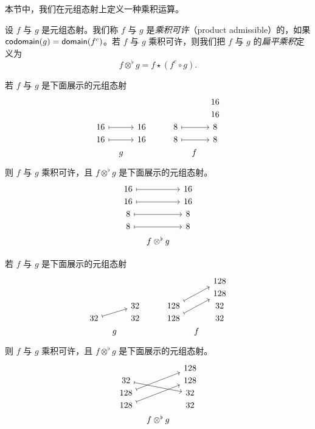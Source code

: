 本节中，我们在元组态射上定义一种乘积运算。 
\begin{definition}
设 $f$ 与 $g$ 是元组态射。我们称 $f$ 与 $g$ 是{\it 乘积可许}（product admissible）的，如果 $\mathsf{codomain}(g) = \mathsf{domain}(f^c)$。若 $f$ 与 $g$ 乘积可许，则我们把 $f$ 与 $g$ 的{\it 扁平乘积}定义为  
    \[
    f \otimes^\flat g = f \star (f^c \circ g).
    \]
\end{definition}



\begin{example}
    若 $f$ 与 $g$ 是下面展示的元组态射
    \[ \begin{tikzcd} [row sep = 1, column sep = 8]
      & & & & & & & 16\\
      & & & & & & & 16\\
     16 \ar[rr,mapsto] & & 16 & & & 8 \ar[rr,mapsto] & & 8\\
    16 \ar[rr,mapsto] & & 16 & & & 8 \ar[rr,mapsto] & & 8\\
    & g & & & & & f & \\
    \end{tikzcd} \]
    则
    $f$ 与 $g$ 乘积可许，且 $f \otimes^\flat g$ 是下面展示的元组态射。
    \[ \begin{tikzcd}[row sep = 1, column sep = 8]
    16 \ar[rr,mapsto] & & 16\\
    16 \ar[rr,mapsto] & & 16 \\
    8 \ar[rr,mapsto] & & 8\\
    8 \ar[rr,mapsto] & & 8 \\
    & f \otimes^\flat g & 
    \end{tikzcd} \]
\end{example}

\begin{example}
    若 $f$ 与 $g$ 是下面展示的元组态射
    \[ \begin{tikzcd} [row sep = 1, column sep = 8]
      & & & & & & & 128\\
      & & & & & & & 128\\
      & & 32 & & & 128 \ar[uurr,mapsto] & & 32\\
    32 \ar[urr,mapsto] & & 32 & & & 128 \ar[uurr,mapsto] & & 32\\
    & g & & & & & f & \\
    \end{tikzcd} \]
    则
    $f$ 与 $g$ 乘积可许，且 $f \otimes^\flat g$ 是下面展示的元组态射。
    \[ \begin{tikzcd}[row sep = 1, column sep = 8]
     & & 128\\
    32 \ar[drr,mapsto] & & 128 \\
    128 \ar[uurr,mapsto] & & 32\\
    128 \ar[uurr,mapsto] & & 32 \\
    & f \otimes^\flat g & 
    \end{tikzcd} \]
\end{example}


